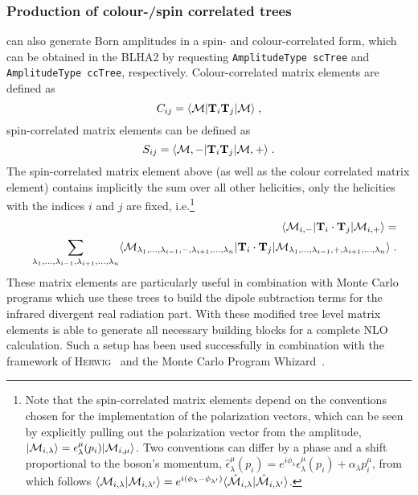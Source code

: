 \subsubsection{Production of colour-/spin correlated trees}
\gosam{} can also generate Born amplitudes in a spin- and colour-correlated form, which can be obtained in the BLHA2 by requesting \texttt{AmplitudeType scTree} and \texttt{AmplitudeType ccTree}, respectively. Colour-correlated matrix elements are defined as
\begin{equation}
 C_{ij}=\langle{{\cal M}}|\textbf{T}_{i}\textbf{T}_j |{{\cal M}}\rangle\;,
\end{equation}
spin-correlated matrix elements can be defined as
\begin{equation}
 S_{ij}=\langle{{\cal M},-}|\textbf{T}_{i}\textbf{T}_j |{{\cal M},+}\rangle\;.
\end{equation}
The spin-correlated matrix element above (as well as the colour correlated matrix element) contains implicitly the sum over all other helicities, only the helicities with the indices $i$ and $j$ are fixed, i.e.\footnote{Note that the spin-correlated matrix elements depend on the conventions chosen for the implementation of the polarization vectors, which can be seen by explicitly pulling out the polarization vector from the amplitude, $|{\cal M}_{i,\lambda}\rangle=\epsilon_\lambda^\mu(p_i)|{\cal M}_{i,\mu}\rangle$. Two conventions can differ by a phase and a shift proportional to the boson's momentum, $\hat{\epsilon}_\lambda^{\mu}(p_i)=e^{i\phi_\lambda}\epsilon_\lambda^\mu(p_i)+\alpha_\lambda p_i^\mu$, from which follows $\langle{\cal M}_{i,\lambda}|{\cal M}_{i,\lambda'}\rangle=e^{i(\phi_{\lambda}-\phi_{\lambda'})}\langle\hat{{\cal M}}_{i,\lambda}|\hat{{\cal M}}_{i,\lambda'}\rangle$.}
 \begin{eqnarray}
&&\langle {\cal M}_{i,-} |{\mathbf T}_i\cdot {\mathbf T}_j |{\cal M}_{i,+}\rangle =\\
&&\sum_{\lambda_1,...,\lambda_{i-1},\lambda_{i+1},...,\lambda_n}
\langle {\cal M}_{\lambda_1,...,\lambda_{i-1},-,\lambda_{i+1},...,\lambda_n} |
{\mathbf T}_i\cdot {\mathbf T}_j |
{\cal M}_{\lambda_1,...,\lambda_{i-1},+,\lambda_{i+1},...,\lambda_n}\rangle \;. \nonumber
\end{eqnarray}
These matrix elements are particularly useful in combination with Monte Carlo programs which use these trees to build the dipole subtraction terms for the infrared divergent real radiation part. With these modified tree level matrix elements \gosam{} is able to generate
all necessary building blocks for a complete NLO calculation. Such a setup has been used successfully in combination with the framework of
\textsc{Herwig}~\cite{LesHouches2013,Bellm:2013lba,Platzer:2011bc} and the Monte Carlo Program Whizard~\cite{Kilian:2007gr,Moretti:2001zz,Stienemeier:2021cse,Braun:2025hvr}.

